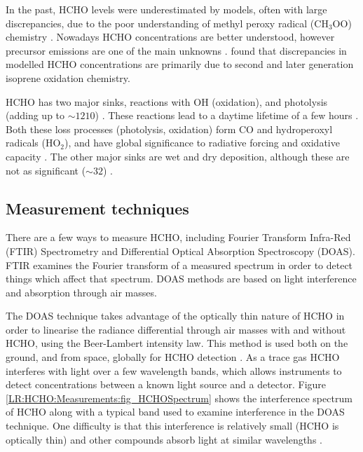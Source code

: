     In the past, HCHO levels were underestimated by models, often with large discrepancies, due to the poor understanding of methyl peroxy radical (CH$_3$OO) chemistry \parencite{Wagner2002}.
    Nowadays HCHO concentrations are better understood, however precursor emissions are one of the main unknowns \parencite[eg.][]{Emmerson2016,Marvin2017}.
    \textcite{Marvin2017} found that discrepancies in modelled HCHO concentrations are primarily due to second and later generation isoprene oxidation chemistry.
    
    HCHO has two major sinks, reactions with OH (oxidation), and photolysis (adding up to $\sim 1210$\tgpyr) \parencite{Levy1972, Crutzen1999, Wagner2002, FortemsCheiney2012, Kefauver2014}.
    These reactions lead to a daytime lifetime of a few hours \parencite{Atkinson2000, Millet2006}.
    Both these loss processes (photolysis, oxidation) form CO and hydroperoxyl radicals (HO$_2$), and have global significance to radiative forcing and oxidative capacity \parencite{Franco2015}.
    The other major sinks are wet and dry deposition, although these are not as significant ($\sim 32$\tgpyr) \parencite{Atkinson2000,FortemsCheiney2012}.
    
    
  \subsection{Measurement techniques}
    \label{LR:HCHO:Measurements}
    There are a few ways to measure HCHO, including Fourier Transform Infra-Red (FTIR) Spectrometry and Differential Optical Absorption Spectroscopy (DOAS).
    FTIR examines the Fourier transform of a measured spectrum in order to detect things which affect that spectrum.
    DOAS methods are based on light interference and absorption through air masses.
    
    The DOAS technique takes advantage of the optically thin nature of HCHO in order to linearise the radiance differential through air masses with and without HCHO, using the Beer-Lambert intensity law.
    This method is used both on the ground, and from space, globally for HCHO detection \parencite{Guenther1995, Abad2015, Davenport2015}.
    As a trace gas HCHO interferes with light over a few wavelength bands, which allows instruments to detect concentrations between a known light source and a detector.
    Figure \ref{LR:HCHO:Measurements:fig_HCHOSpectrum} shows the interference spectrum of HCHO along with a typical band used to examine interference in the DOAS technique.
    One difficulty is that this interference is relatively small (HCHO is optically thin) and other compounds absorb light at similar wavelengths \parencite{Davenport2015}.
    
